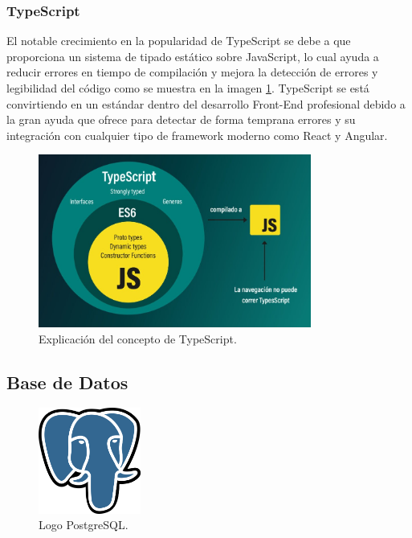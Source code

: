 \subsubsection*{TypeScript}
El notable crecimiento en la popularidad de TypeScript se debe a que proporciona un sistema de tipado estático sobre JavaScript, lo cual ayuda a reducir errores en tiempo de compilación y mejora la detección de errores y legibilidad del código como se muestra en la imagen \ref{fig:ts}. TypeScript se está convirtiendo en un estándar dentro del desarrollo Front-End profesional debido a la gran ayuda que ofrece para detectar de forma temprana errores y su integración con cualquier tipo de framework moderno como React y Angular.
\begin{figure}[H]
    \centering
    \includegraphics[width=0.8\textwidth]{fotos/typescript.jpg}
    \caption{Explicación del concepto de TypeScript\textbf{}.}
    \label{fig:ts}
\end{figure}

\subsection{Base de Datos}
\begin{figure}[H]
    \centering
    \includegraphics[width=0.3\textwidth]{fotos/postgre.png}
    \caption{Logo PostgreSQL\textbf{}.}
    \label{fig:psql}
\end{figure}
